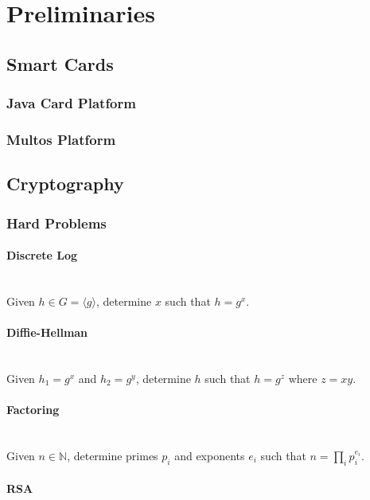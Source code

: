 \chapter{Preliminaries}

\section{Smart Cards}

\subsection{Java Card Platform}

\subsection{Multos Platform}

\section{Cryptography}

\subsection{Hard Problems}

\subsubsection{Discrete Log}~\\

Given $h \in G = \langle g \rangle$, determine $x$ such that $h = g^x$.

\subsubsection{Diffie-Hellman}~\\

Given $h_1 = g^x$ and $h_2 = g^y$, determine $h$ such that $h = g^z$ where $z = xy$.

\subsubsection{Factoring}~\\

Given $n \in \mathbb{N}$, determine primes $p_i$ and exponents $e_i$ such that $n = \prod_i p_i^{e_i}$.

\subsubsection{RSA}~\\

